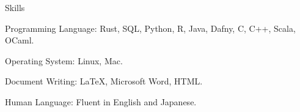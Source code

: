 \documentclass{resume} %
\begin{document}
\begin{rSection}{Skills}
  \begin{rSubsection}{}{}{}{}
  \item Programming Language: Rust, SQL, Python, R, Java, Dafny, C, C++, Scala, OCaml.
  \item Operating System: Linux, Mac.
  \item Document Writing: LaTeX, Microsoft Word, HTML.
  \item Human Language: Fluent in English and Japanese.
  \end{rSubsection}
\end{rSection}
\end{document}
